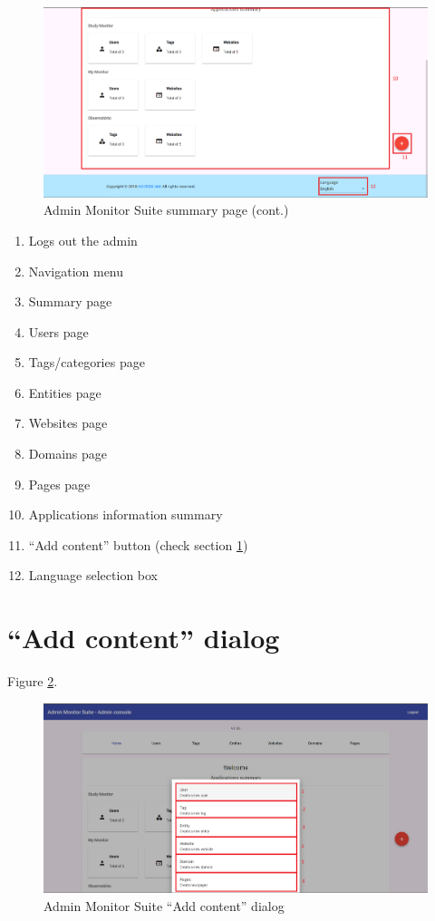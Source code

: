 \begin{figure}[H]
    \centering
    \includegraphics[width=\linewidth]{lib/images/admin/admin_summary_page_2.png}
    \caption{Admin Monitor Suite summary page (cont.)}
    \label{fig:admin_summary_page_2}
\end{figure}

\begin{enumerate}
    \item Logs out the admin
    \item Navigation menu
    \item Summary page
    \item Users page
    \item Tags/categories page
    \item Entities page
    \item Websites page
    \item Domains page
    \item Pages page
    \item Applications information summary
    \item ``Add content'' button (check section \ref{sec:admin_add_content_dialog})
    \item Language selection box
\end{enumerate}

\section{``Add content'' dialog}
\label{sec:admin_add_content_dialog}

Figure \ref{fig:admin_add_content_dialog}.

\begin{figure}[H]
    \centering
    \includegraphics[width=\linewidth]{lib/images/admin/admin_add_content_dialog.png}
    \caption{Admin Monitor Suite ``Add content'' dialog}
    \label{fig:admin_add_content_dialog}
\end{figure}

